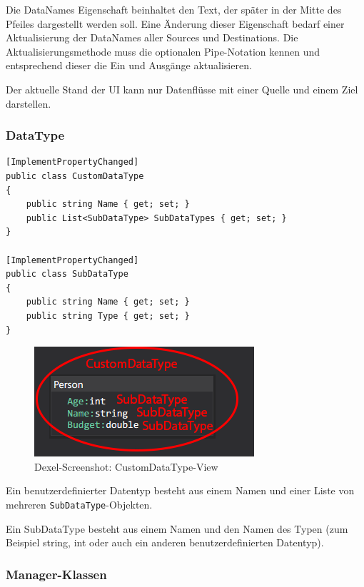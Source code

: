Die DataNames Eigenschaft beinhaltet den Text, der später in der Mitte des
Pfeiles dargestellt werden soll. Eine Änderung dieser Eigenschaft bedarf
einer Aktualisierung der DataNames aller Sources und Destinations.
Die Aktualisierungsmethode muss die optionalen Pipe-Notation kennen und
entsprechend dieser die Ein und Ausgänge aktualisieren.

Der aktuelle Stand der UI kann nur Datenflüsse mit einer Quelle und
einem Ziel darstellen.

\subsubsection{DataType}

\begin{lstlisting}[caption= CustomDataType und SubDataType Klasse]
[ImplementPropertyChanged]
public class CustomDataType
{
	public string Name { get; set; }
	public List<SubDataType> SubDataTypes { get; set; }
}

[ImplementPropertyChanged]
public class SubDataType
{
	public string Name { get; set; }
	public string Type { get; set; }
}
\end{lstlisting}


\begin{figure}[H]
	\centering
	\includegraphics[width=0.5\linewidth]{./img/CustomDataType.png} 
	\caption{Dexel-Screenshot: CustomDataType-View}
\end{figure}


Ein benutzerdefinierter Datentyp besteht aus einem Namen und einer Liste von mehreren
\texttt{SubDataType}-Objekten. 

Ein SubDataType besteht aus einem Namen und den Namen
des Typen (zum Beispiel string, int oder auch ein anderen benutzerdefinierten
Datentyp).

\subsubsection{Manager-Klassen}

